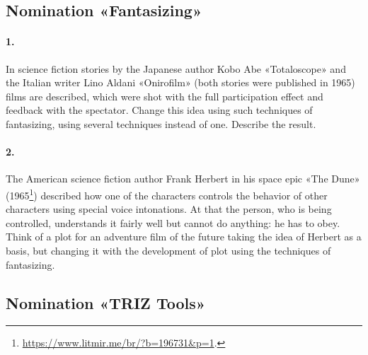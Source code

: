 \documentclass[11pt,a4paper]{article}
\begin{document}
\subsection*{Nomination «Fantasizing»}

\paragraph{1.}
In science fiction stories by the Japanese author Kobo Abe «Totaloscope» and
the Italian writer Lino Aldani «Onirofilm» (both stories were published in
1965) films are described, which were shot with the full participation effect
and feedback with the spectator.  Change this idea using such techniques of
fantasizing, using several techniques instead of one.  Describe the result.

\paragraph{2.}
The American science fiction author Frank Herbert in his space epic «The Dune»
(1965\footnote{\url{https://www.litmir.me/br/?b=196731&p=1}.}) described how
one of the characters controls the behavior of other characters using special
voice intonations. At that the person, who is being controlled, understands it
fairly well but cannot do anything: he has to obey. Think of a plot for an
adventure film of the future taking the idea of Herbert as a basis, but
changing it with the development of plot using the techniques of fantasizing.

\subsection*{Nomination «TRIZ Tools»}
\end{document}
